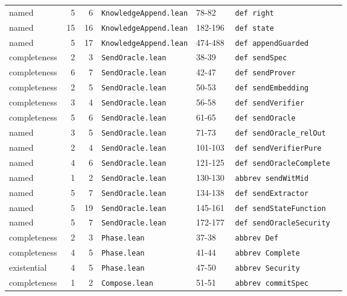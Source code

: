 {\begin{longtable}{@{}>{\raggedright\arraybackslash}p{0.12\linewidth}rr>{\raggedright\arraybackslash}p{0.2\linewidth}l>{\raggedright\arraybackslash}p{0.33\linewidth}@{}}
named & 5 & 6 & \texttt{KnowledgeAppend.\allowbreak{}lean} & 78-82 & \texttt{def right} \\
named & 15 & 16 & \texttt{KnowledgeAppend.\allowbreak{}lean} & 182-196 & \texttt{def state} \\
named & 5 & 17 & \texttt{KnowledgeAppend.\allowbreak{}lean} & 474-488 & \texttt{def appendGuarded} \\
completeness & 2 & 3 & \texttt{SendOracle.\allowbreak{}lean} & 38-39 & \texttt{def sendSpec} \\
completeness & 6 & 7 & \texttt{SendOracle.\allowbreak{}lean} & 42-47 & \texttt{def sendProver} \\
completeness & 2 & 5 & \texttt{SendOracle.\allowbreak{}lean} & 50-53 & \texttt{def sendEmbedding} \\
completeness & 3 & 4 & \texttt{SendOracle.\allowbreak{}lean} & 56-58 & \texttt{def sendVerifier} \\
completeness & 5 & 6 & \texttt{SendOracle.\allowbreak{}lean} & 61-65 & \texttt{def sendOracle} \\
named & 3 & 5 & \texttt{SendOracle.\allowbreak{}lean} & 71-73 & \texttt{def sendOracle\_\allowbreak{}relOut} \\
named & 2 & 4 & \texttt{SendOracle.\allowbreak{}lean} & 101-103 & \texttt{def sendVerifierPure} \\
named & 4 & 6 & \texttt{SendOracle.\allowbreak{}lean} & 121-125 & \texttt{def sendOracleComplete} \\
named & 1 & 2 & \texttt{SendOracle.\allowbreak{}lean} & 130-130 & \texttt{abbrev sendWitMid} \\
named & 5 & 7 & \texttt{SendOracle.\allowbreak{}lean} & 134-138 & \texttt{def sendExtractor} \\
named & 5 & 19 & \texttt{SendOracle.\allowbreak{}lean} & 145-161 & \texttt{def sendStateFunction} \\
named & 5 & 7 & \texttt{SendOracle.\allowbreak{}lean} & 172-177 & \texttt{def sendOracleSecurity} \\
completeness & 2 & 3 & \texttt{Phase.\allowbreak{}lean} & 37-38 & \texttt{abbrev Def} \\
completeness & 4 & 5 & \texttt{Phase.\allowbreak{}lean} & 41-44 & \texttt{abbrev Complete} \\
existential & 4 & 5 & \texttt{Phase.\allowbreak{}lean} & 47-50 & \texttt{abbrev Security} \\
completeness & 1 & 2 & \texttt{Compose.\allowbreak{}lean} & 51-51 & \texttt{abbrev commitSpec} \\

\end{longtable}}
